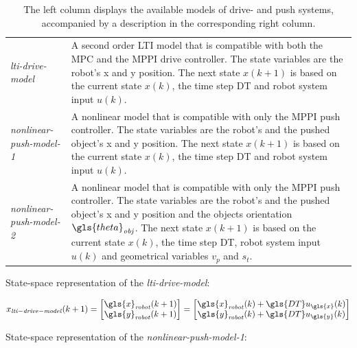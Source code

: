 \begin{table}[H]
\caption{The left column displays the available models of drive- and push systems, accompanied by a description in the corresponding right column.}\label{table:available_system_models}
\centering
\begin{tabular}%
  {>{\raggedright\arraybackslash}p{}%
   >{\raggedright\arraybackslash}p{}}
\textit{lti-drive-model} & A second order \ac{LTI} model that is compatible with both the \ac{MPC} and the \ac{MPPI} drive controller. The state variables are the robot's \gls{x} and \gls{y} position. The next state $x(k+1)$ is based on the current state $x(k)$, the time step \gls{DT} and robot system input $u(k)$.\\
\textit{nonlinear-push-model-1} & A nonlinear model that is compatible with only the \ac{MPPI} push controller. The state variables are the robot's and the pushed object's \gls{x} and \gls{y} position. The next state $x(k+1)$ is based on the current state $x(k)$, the time step \gls{DT} and robot system input $u(k)$.\\
\textit{nonlinear-push-model-2} & 
A nonlinear model that is compatible with only the \ac{MPPI} push controller. The state variables are the robot's and the pushed object's \gls{x} and \gls{y} position and the objects orientation $\gls{theta}_\mathit{obj}$. The next state $x(k+1)$ is based on the current state $x(k)$, the time step \gls{DT}, robot system input $u(k)$ and geometrical variables $v_p$ and $s_t$.\\
\end{tabular}
\end{table}

State-space representation of the \textit{lti-drive-model}:\bs

\begin{equation}
\label{eq:lti-drive-model}
x_{\mathit{lti-drive-model}}(k+1)=
\begin{bmatrix}
\gls{x}_\mathit{robot}(k+1)\\
\gls{y}_\mathit{robot}(k+1)
\end{bmatrix}
=
\begin{bmatrix}
\gls{x}_{\mathit{robot}}(k) + \gls{DT} u_{\gls{x}}(k)\\
\gls{y}_{\mathit{robot}}(k) + \gls{DT} u_{\gls{y}}(k)
\end{bmatrix}
\end{equation}

State-space representation of the \textit{nonlinear-push-model-1}:\bs

